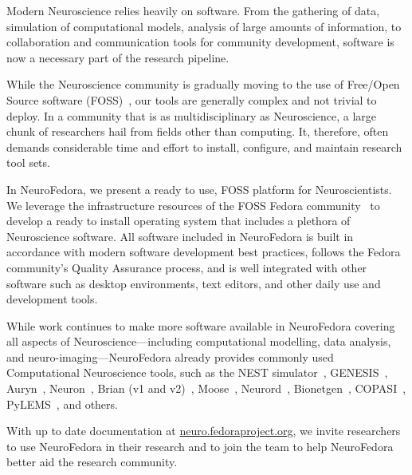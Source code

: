 
Modern Neuroscience relies heavily on software.
From the gathering of data, simulation of computational models, analysis of large amounts of information, to collaboration and communication tools for community development, software is now a necessary part of the research pipeline.

While the Neuroscience community is gradually moving to the use of Free/Open Source software (FOSS)~\cite{Gleeson2017}, our tools are generally complex and not trivial to deploy.
In a community that is as multidisciplinary as Neuroscience, a large chunk of researchers hail from fields other than computing.
It, therefore, often demands considerable time and effort to install, configure, and maintain research tool sets.

In NeuroFedora, we present a ready to use, FOSS platform for Neuroscientists.
We leverage the infrastructure resources of the FOSS Fedora community~\cite{RedHat2008} to develop a ready to install operating system that includes a plethora of Neuroscience software.
All software included in NeuroFedora is built in accordance with modern software development best practices, follows the Fedora community's Quality Assurance process, and is well integrated with other software such as desktop environments, text editors, and other daily use and development tools.

While work continues to make more software available in NeuroFedora covering all aspects of Neuroscience---including computational modelling, data analysis, and neuro-imaging---NeuroFedora already provides commonly used Computational Neuroscience tools, such as the NEST simulator~\cite{Linssen2018}, GENESIS~\cite{Bower2003}, Auryn~\cite{Zenke2014}, Neuron~\cite{Hines1997}, Brian (v1 and v2)~\cite{Goodman2009}, Moose~\cite{Dudani2009}, Neurord~\cite{Jedrzejewski2016}, Bionetgen~\cite{Harris2016}, COPASI~\cite{Mendes2009}, PyLEMS~\cite{Vella2014}, and others.

With up to date documentation at \url{neuro.fedoraproject.org}, we invite researchers to use NeuroFedora in their research and to join the team to help NeuroFedora better aid the research community.
